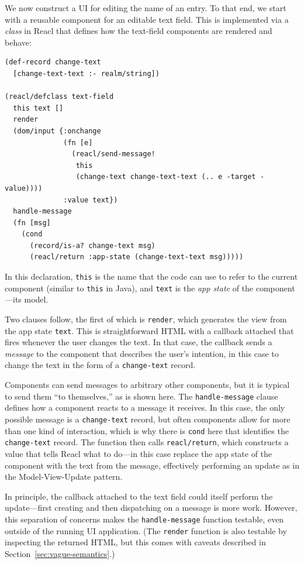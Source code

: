 \documentclass[sigplan,screen]{acmart}
\begin{document}
We now construct a UI for editing the name of an entry.  To that end,
we start with a reusable component for an editable text field.  This
is implemented via a \textit{class} in Reacl that defines how the
text-field components are rendered and behave:
%
\begin{verbatim}
(def-record change-text
  [change-text-text :- realm/string])

(reacl/defclass text-field
  this text []
  render
  (dom/input {:onchange 
              (fn [e]
                (reacl/send-message!
                 this
                 (change-text change-text-text (.. e -target -value))))
              :value text})
  handle-message
  (fn [msg]
    (cond
      (record/is-a? change-text msg)
      (reacl/return :app-state (change-text-text msg)))))
\end{verbatim}
%
In this declaration, \texttt{this} is the name that the code can use
to refer to the current component (similar to \texttt{this} in Java),
and \texttt{text} is the \textit{app state} of the component---its
model.

Two clauses follow, the first of which is \texttt{render}, which
generates the view from the app state \texttt{text}.  This is
straightforward HTML with a callback attached that fires whenever the
user changes the text.  In that case, the callback sends a
\textit{message} to the component that describes the user's intention,
in this case to change the text in the form of a \texttt{change-text}
record.

Components can send messages to arbitrary other components, but it is
typical to send them ``to themselves,'' as is shown here.  The
\texttt{handle-message} clause defines how a component reacts to a
message it receives.  In this case, the only possible message is a
\texttt{change-text} record, but often components allow for more than
one kind of interaction, which is why there is \texttt{cond} here that
identifies the \texttt{change-text} record.  The function then calls
\texttt{reacl/return}, which constructs a value that tells Reacl what
to do---in this case replace the app state of the component with the
text from the message, effectively performing an update as in the
Model-View-Update pattern.

In principle, the callback attached to the text field could itself
perform the update---first creating and then dispatching on a message
is more work.  However, this separation of concerns makes the
\texttt{handle-message} function testable, even outside of the running
UI application.  (The \texttt{render} function is also testable by
inspecting the returned HTML, but this comes with caveats described in
Section~\ref{sec:vague-semantics}.)
\end{document}
